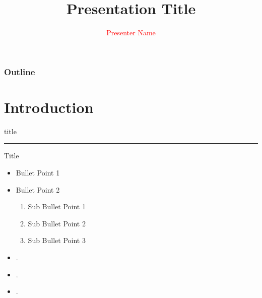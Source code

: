 \documentclass{beamer} %
\title[\textcolor{red}{Presentation Title}]{\textbf{Presentation Title}}
\author[\textcolor{white}{Presenter Name}]{{\Large\textcolor{red}{Presenter Name}}}
\institute[\textcolor{white}{Brock University}]{
Department Name or Affiliations}
\date{}
\begin{document}
\begin{frame}
  \titlepage
\end{frame}
\begin{frame}\frametitle{Outline}
  \tableofcontents[hideallsubsections]
\end{frame}
\section{Introduction}
    \begin{frame}[plain]
        \vfill
      \centering
      \begin{beamercolorbox}[sep=8pt,center,shadow=true,rounded=true]{title}
        \insertsectionhead\par%
        \color{blue}\noindent\rule{10cm}{1pt}
      \end{beamercolorbox}
      \vfill
  \end{frame}
\begin{frame}{Title}
    \begin{itemize}
        \item Bullet Point 1
        \item Bullet Point 2
        \begin{enumerate}
            \item Sub Bullet Point 1
            \item Sub Bullet Point 2
            \item Sub Bullet Point 3
        \end{enumerate}
        \item \lipsum[1][1] \cite{nsga2}.
        \item \lipsum[1][2] \cite{nsga2}.
        \item \lipsum[1][3] \cite{nsga2}.
    \end{itemize} 
\end{frame}
\end{document}
